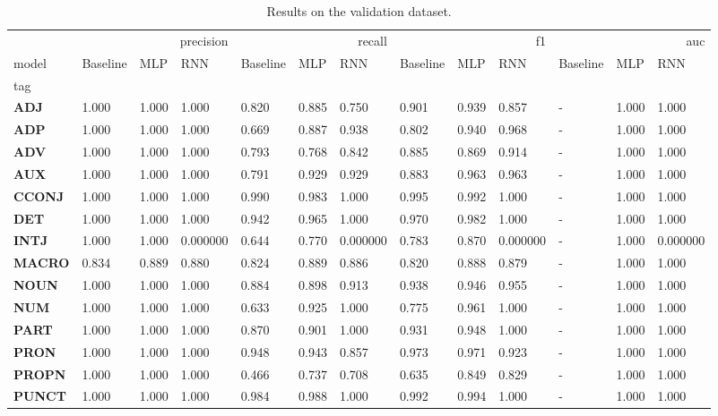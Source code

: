 \begin{table}
\caption{Results on the validation dataset.}
\label{tab::ex_2_valid}
\begin{tabular}{|l||l||l||l||l||l||l||l||l||l||l||l||l|}
\toprule
 & \multicolumn{3}{r}{precision} & \multicolumn{3}{r}{recall} & \multicolumn{3}{r}{f1} & \multicolumn{3}{r}{auc} \\
model & Baseline & MLP & RNN & Baseline & MLP & RNN & Baseline & MLP & RNN & Baseline & MLP & RNN \\
tag &  &  &  &  &  &  &  &  &  &  &  &  \\
\midrule
\textbf{ADJ} & 1.000 & 1.000 & 1.000 & 0.820 & 0.885 & 0.750 & 0.901 & 0.939 & 0.857 & - & 1.000 & 1.000 \\
\textbf{ADP} & 1.000 & 1.000 & 1.000 & 0.669 & 0.887 & 0.938 & 0.802 & 0.940 & 0.968 & - & 1.000 & 1.000 \\
\textbf{ADV} & 1.000 & 1.000 & 1.000 & 0.793 & 0.768 & 0.842 & 0.885 & 0.869 & 0.914 & - & 1.000 & 1.000 \\
\textbf{AUX} & 1.000 & 1.000 & 1.000 & 0.791 & 0.929 & 0.929 & 0.883 & 0.963 & 0.963 & - & 1.000 & 1.000 \\
\textbf{CCONJ} & 1.000 & 1.000 & 1.000 & 0.990 & 0.983 & 1.000 & 0.995 & 0.992 & 1.000 & - & 1.000 & 1.000 \\
\textbf{DET} & 1.000 & 1.000 & 1.000 & 0.942 & 0.965 & 1.000 & 0.970 & 0.982 & 1.000 & - & 1.000 & 1.000 \\
\textbf{INTJ} & 1.000 & 1.000 & 0.000000 & 0.644 & 0.770 & 0.000000 & 0.783 & 0.870 & 0.000000 & - & 1.000 & 0.000000 \\
\textbf{MACRO} & 0.834 & 0.889 & 0.880 & 0.824 & 0.889 & 0.886 & 0.820 & 0.888 & 0.879 & - & 1.000 & 1.000 \\
\textbf{NOUN} & 1.000 & 1.000 & 1.000 & 0.884 & 0.898 & 0.913 & 0.938 & 0.946 & 0.955 & - & 1.000 & 1.000 \\
\textbf{NUM} & 1.000 & 1.000 & 1.000 & 0.633 & 0.925 & 1.000 & 0.775 & 0.961 & 1.000 & - & 1.000 & 1.000 \\
\textbf{PART} & 1.000 & 1.000 & 1.000 & 0.870 & 0.901 & 1.000 & 0.931 & 0.948 & 1.000 & - & 1.000 & 1.000 \\
\textbf{PRON} & 1.000 & 1.000 & 1.000 & 0.948 & 0.943 & 0.857 & 0.973 & 0.971 & 0.923 & - & 1.000 & 1.000 \\
\textbf{PROPN} & 1.000 & 1.000 & 1.000 & 0.466 & 0.737 & 0.708 & 0.635 & 0.849 & 0.829 & - & 1.000 & 1.000 \\
\textbf{PUNCT} & 1.000 & 1.000 & 1.000 & 0.984 & 0.988 & 1.000 & 0.992 & 0.994 & 1.000 & - & 1.000 & 1.000 \\

\end{tabular}
\end{table}
